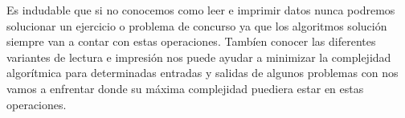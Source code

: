 Es indudable que si no conocemos como leer e imprimir datos nunca podremos solucionar un ejercicio o problema de concurso ya que los algoritmos solución siempre van a contar con estas operaciones. Tambíen conocer las diferentes variantes de lectura e impresión nos puede ayudar a minimizar la complejidad algorítmica para determinadas entradas y salidas de algunos problemas con nos vamos a enfrentar donde su máxima complejidad puediera estar en estas operaciones.

 
